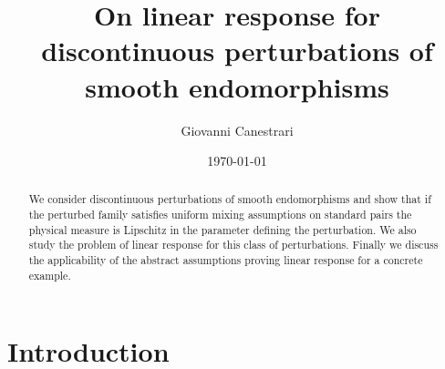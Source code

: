 \documentclass{amsart}
\numberwithin{equation}{section}
\begin{document}
\title{On linear response for discontinuous perturbations of smooth endomorphisms}



\author{Giovanni Canestrari}
\address{Department of Mathematics, University of Toronto, 
40 St.~George Street, Toronto, ON M5S 2E4, Canada. Email:
\texttt{giovanni.canestrari@utoronto.ca}.}



\date{\today} 


\begin{abstract}
We consider discontinuous perturbations of smooth endomorphisms and show that if the perturbed family satisfies uniform mixing assumptions on standard pairs the physical measure is Lipschitz in the parameter defining the perturbation. We also study the problem of linear response for this class of perturbations. Finally we discuss the applicability of the abstract assumptions proving linear response for a concrete example.
\end{abstract}




\maketitle
\tableofcontents




\section{Introduction}
\end{document}
